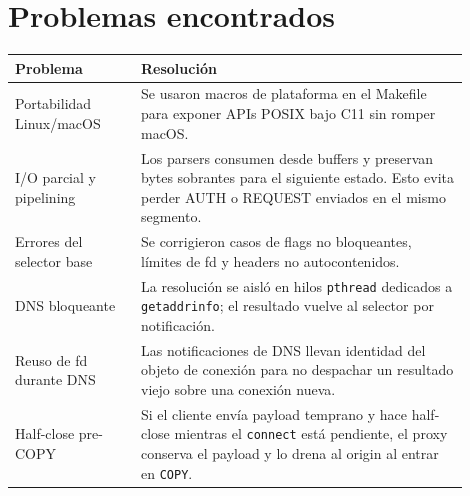 \section{Problemas encontrados}

\begin{longtable}{>{\raggedright\arraybackslash}p{0.25\linewidth}>{\raggedright\arraybackslash}p{0.65\linewidth}}
\toprule
\textbf{Problema} & \textbf{Resolución} \\
\midrule
Portabilidad Linux/macOS & Se usaron macros de plataforma en el Makefile para
exponer APIs POSIX bajo C11 sin romper macOS. \\
I/O parcial y pipelining & Los parsers consumen desde buffers y preservan bytes
sobrantes para el siguiente estado. Esto evita perder AUTH o REQUEST enviados en
el mismo segmento. \\
Errores del selector base & Se corrigieron casos de flags no bloqueantes,
límites de fd y headers no autocontenidos. \\
DNS bloqueante & La resolución se aisló en hilos \texttt{pthread} dedicados a
\texttt{getaddrinfo}; el resultado vuelve al selector por notificación. \\
Reuso de fd durante DNS & Las notificaciones de DNS llevan identidad del objeto
de conexión para no despachar un resultado viejo sobre una conexión nueva. \\
Half-close pre-COPY & Si el cliente envía payload temprano y hace half-close
mientras el \texttt{connect} está pendiente, el proxy conserva el payload y lo
drena al origin al entrar en \texttt{COPY}. \\
\bottomrule
\end{longtable}
